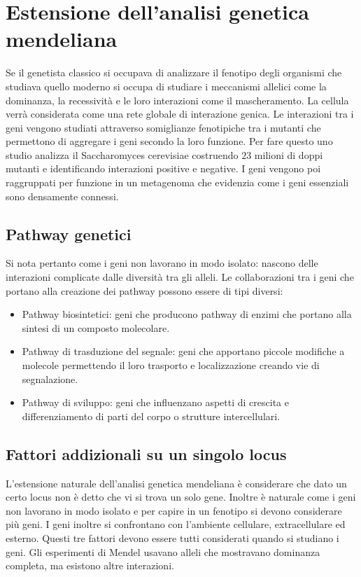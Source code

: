 \chapter{Estensione dell'analisi genetica mendeliana}
Se il genetista classico si occupava di analizzare il fenotipo degli organismi che studiava quello moderno si occupa di studiare i meccanismi allelici come la dominanza, la 
recessivit\`a e le loro interazioni come il mascheramento. La cellula verr\`a considerata come una rete globale di interazione genica. Le interazioni tra i geni vengono studiati 
attraverso somiglianze fenotipiche tra i mutanti che permettono di aggregare i geni secondo la loro funzione. Per fare questo uno studio analizza il Saccharomyces cerevisiae costruendo
$23$ milioni di doppi mutanti e identificando  interazioni positive e  negative. I geni vengono poi raggruppati per funzione in un metagenoma che
evidenzia come i geni essenziali sono densamente connessi. 
\section{Pathway genetici}
Si nota pertanto come i geni non lavorano in modo isolato: nascono delle interazioni complicate dalle diversit\`a tra gli alleli. Le collaborazioni tra i geni che portano alla
creazione dei pathway possono essere di tipi diversi:
\begin{itemize}
	\item Pathway biosintetici: geni che producono pathway di enzimi che portano alla sintesi di un composto molecolare.
	\item Pathway di trasduzione del segnale: geni che apportano piccole modifiche a molecole permettendo il loro trasporto e localizzazione creando vie di segnalazione.
	\item Pathway di sviluppo: geni che influenzano aspetti di crescita e differenziamento di parti del corpo o strutture intercellulari.
\end{itemize}
\section{Fattori addizionali su un singolo locus}
L'estensione naturale dell'analisi genetica mendeliana \`e considerare che dato un certo locus non \`e detto che vi si trova un solo gene. Inoltre \`e naturale come i geni non 
lavorano in modo isolato e per capire in un fenotipo si devono considerare pi\`u geni. I geni inoltre si confrontano con l'ambiente cellulare, extracellulare ed esterno. Questi tre
fattori devono essere tutti considerati quando si studiano i geni. Gli esperimenti di Mendel usavano alleli che mostravano dominanza completa, ma esistono altre interazioni.
